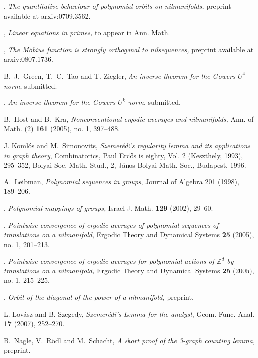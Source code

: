 \documentclass[11pt,reqno]{amsart}
\numberwithin{equation}{section}
\theoremstyle{plain}
\theoremstyle{definition}
\newcommand\Z{\mathbb{Z}}
\newcommand\1{{\bf 1}}
\newcommand\2{{\bf 2}}
\begin{document}
\begin{thebibliography}{99}
 \bysame, \emph{The quantitative behaviour of polynomial orbits on nilmanifolds,} preprint available at arxiv:0709.3562.

\bysame, \emph{Linear equations in primes,} to appear in Ann. Math.

 \bysame, \emph{The M\"obius function is strongly orthogonal to nilsequences,} preprint available at arxiv:0807.1736.


B.~J.~Green, T.~C.~Tao and T. Ziegler, \emph{An inverse theorem for the Gowers $U^4$-norm}, submitted.

\bysame, \emph{An inverse theorem for the Gowers $U^k$-norm}, submitted.

 B.~Host and B.~Kra, \emph{Nonconventional ergodic averages and nilmanifolds,} Ann. of Math. (2) \textbf{161}
(2005), no. 1, 397--488.

J. Koml\'os and M.~Simonovits, 
\emph{Szemer\'edi's regularity lemma and its applications in graph theory},
Combinatorics, Paul Erd\H{o}s is eighty, Vol. 2 (Keszthely, 1993), 295--352, 
Bolyai Soc. Math. Stud., 2, J\'anos Bolyai Math. Soc., Budapest, 1996.

A.~Leibman, \emph{Polynomial sequences in groups}, Journal of Algebra 201 (1998), 189--206.

 \bysame, \emph{Polynomial mappings of groups,}
Israel J. Math. \textbf{129} (2002), 29--60.

\bysame, \emph{Pointwise convergence of ergodic averages of polynomial sequences of translations on a nilmanifold}, Ergodic Theory and Dynamical Systems \textbf{25} (2005), no. 1, 201--213.

 \bysame, \emph{Pointwise convergence of ergodic averages for polynomial actions of $\Z^d$ by translations on a nilmanifold,} Ergodic Theory and Dynamical Systems \textbf{25} (2005), no. 1, 215--225.

 \bysame, \emph{Orbit of the diagonal of the power of a nilmanifold,} preprint.

L. Lov\'asz and B. Szegedy, \emph{Szemer\'edi's Lemma for the analyst}, Geom. Func. Anal. \textbf{17} (2007), 252--270. 

B.~Nagle, V.~R\"odl and M.~Schacht, \emph{A short proof of the 3-graph counting lemma,} preprint.


\end{thebibliography}
\end{document}
